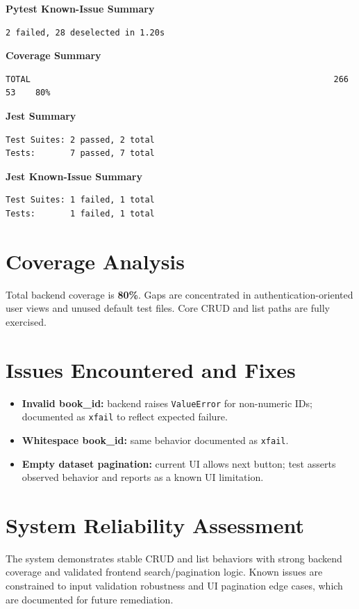 \documentclass[11pt]{article}
\begin{document}
\textbf{Pytest Known-Issue Summary}\
\begin{verbatim}
2 failed, 28 deselected in 1.20s
\end{verbatim}

\textbf{Coverage Summary}\
\begin{verbatim}
TOTAL                                                             266     53    80%
\end{verbatim}

\textbf{Jest Summary}\
\begin{verbatim}
Test Suites: 2 passed, 2 total
Tests:       7 passed, 7 total
\end{verbatim}

\textbf{Jest Known-Issue Summary}\
\begin{verbatim}
Test Suites: 1 failed, 1 total
Tests:       1 failed, 1 total
\end{verbatim}

\section{Coverage Analysis}
Total backend coverage is \textbf{80\%}. Gaps are concentrated in authentication-oriented user views and unused default test files. Core CRUD and list paths are fully exercised.

\section{Issues Encountered and Fixes}
\begin{itemize}
    \item \textbf{Invalid book\_id:} backend raises \texttt{ValueError} for non-numeric IDs; documented as \texttt{xfail} to reflect expected failure.
    \item \textbf{Whitespace book\_id:} same behavior documented as \texttt{xfail}.
    \item \textbf{Empty dataset pagination:} current UI allows next button; test asserts observed behavior and reports as a known UI limitation.
\end{itemize}

\section{System Reliability Assessment}
The system demonstrates stable CRUD and list behaviors with strong backend coverage and validated frontend search/pagination logic. Known issues are constrained to input validation robustness and UI pagination edge cases, which are documented for future remediation.
\end{document}
